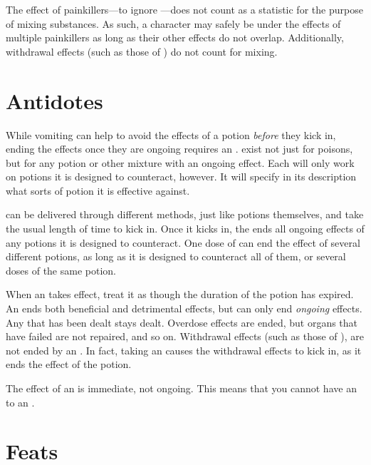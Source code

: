 The effect of painkillers---to ignore {\damage}---does not count as a statistic for the purpose of mixing substances.
As such, a character may safely be under the effects of multiple painkillers as long as their other effects do not overlap.
Additionally, withdrawal effects (such as those of ) do not count for mixing.

\section{Antidotes}

While vomiting can help to avoid the effects of a potion \emph{before} they kick in, ending the effects once they are ongoing requires an {\antidote}.
\capital{\antidotes} exist not just for poisons, but for any potion or other mixture with an ongoing effect.
Each {\antidote} will only work on potions it is designed to counteract, however.
It will specify in its description what sorts of potion it is effective against.

\capital{\antidotes} can be delivered through different methods, just like potions themselves, and take the usual length of time to kick in.
Once it kicks in, the {\antidote} ends all ongoing effects of any potions it is designed to counteract.
One dose of {\antidote} can end the effect of several different potions, as long as it is designed to counteract all of them, or several doses of the same potion.

When an {\antidote} takes effect, treat it as though the duration of the potion has expired.
An {\antidote} ends both beneficial and detrimental effects, but can only end \emph{ongoing} effects.
Any {\damage} that has been dealt stays dealt.
Overdose effects are ended, but organs that have failed are not repaired, and so on.
Withdrawal effects (such as those of ), are not ended by an {\antidote}.
In fact, taking an {\antidote} causes the withdrawal effects to kick in, as it ends the effect of the potion.

The effect of an {\antidote} is immediate, not ongoing.
This means that you cannot have an {\antidote} to an {\antidote}.

\section{Feats}

